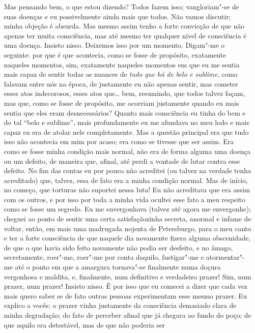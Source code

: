 Mas pensando bem, o que estou dizendo? Todos fazem isso; vangloriam"-se
de suas doenças e eu possivelmente ainda mais que todos. Não vamos
discutir; minha objeção é absurda. Mas mesmo assim tenho a forte
convicção de que não apenas ter muita consciência, mas até mesmo ter
qualquer nível de consciência é uma doença. Insisto nisso. Deixemos
isso por um momento. Digam"-me o seguinte: por que é que acontecia, como
se fosse de propósito, exatamente naqueles momentos, sim, exatamente
naqueles momentos em que eu me sentia mais capaz de sentir todas as
nuances de \textit{tudo que há de belo e sublime}, como falavam entre nós na
época, de justamente eu não apenas sentir, mas cometer esses atos
indecorosos, esses atos que\ldots{} bem, resumindo, que todos talvez façam,
mas que, como se fosse de propósito, me ocorriam justamente quando eu
mais sentia que eles eram desnecessários? Quanto mais consciência eu
tinha do bem e do tal ``belo e sublime'', mais profundamente eu me
afundava no meu lodo e mais capaz eu era de atolar nele completamente.
Mas a questão principal era que tudo isso não acontecia em mim por
acaso; era como se tivesse que ser assim. Era como se fosse minha
condição mais normal, não era de forma alguma uma doença ou um defeito,
de maneira que, afinal, até perdi a vontade de lutar contra esse
defeito. No fim das contas eu por pouco não acreditei (ou talvez na
verdade tenha acreditado) que, talvez, essa de fato era a minha
condição normal. Mas de início, no começo, que torturas não suportei
nessa luta! Eu não acreditava que era assim com os outros, e por isso
por toda a minha vida ocultei esse fato a meu respeito como se fosse um
segredo. Eu me envergonhava (talvez até agora me envergonhe); cheguei
ao ponto de sentir uma certa satisfaçãozinha secreta, anormal e infame
de voltar, então, em mais uma madrugada nojenta de Petersburgo, para o
meu canto e ter a forte consciência de que naquele dia novamente fizera
alguma obscenidade, de que o que havia sido feito novamente não podia
ser desfeito, e no âmago, secretamente, roer"-me, roer"-me por conta
daquilo, fustigar"-me e atormentar"-me até o ponto em que a amargura
tornava"-se finalmente numa doçura vergonhosa e maldita, e, finalmente,
num definitivo e verdadeiro prazer! Sim, num prazer, num prazer!
Insisto nisso. É por isso que eu comecei a dizer que cada vez mais
quero saber se de fato outras pessoas experimentam esse mesmo prazer.
Eu explico a vocês: o prazer vinha justamente da consciência demasiado
clara de minha degradação; do fato de perceber afinal que já chegara ao
fundo do poço; de que aquilo era detestável, mas de que não poderia ser
